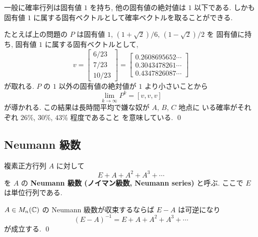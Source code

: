 \documentclass[12pt,twoside]{jarticle}
\begin{document}
\begin{guide}
  一般に確率行列は固有値 $1$ を持ち, 他の固有値の絶対値は $1$ 以下である.
  しかも固有値 $1$ に属する固有ベクトルとして確率ベクトルを取ることができる.

  たとえば上の問題の $P$ は固有値 $1$, $(1+\sqrt{2})/6$, $(1-\sqrt{2})/2$ を
  固有値に持ち, 固有値 $1$ に属する固有ベクトルとして,
  \begin{equation*}
    v = 
    \begin{bmatrix}
      6/23 \\ 7/23 \\ 10/23
    \end{bmatrix}
    =
    \begin{bmatrix}
      0.2608695652\cdots \\ 
      0.3043478261\cdots \\
      0.4347826087\cdots
    \end{bmatrix}
  \end{equation*}
  が取れる.  $P$ の $1$ 以外の固有値の絶対値が $1$ より小さいことから
  \begin{equation*}
    \lim_{k\to\infty} P^k = [v,v,v]
  \end{equation*}
  が導かれる.
  この結果は長時間平均で嫌な奴が $A$, $B$, $C$ 地点に
  いる確率がそれぞれ $26\%$, $30\%$, $43\%$ 程度であること
  を意味している.
  \qed
\end{guide}


\subsection{Neumann 級数}

複素正方行列 $A$ に対して
\begin{equation*}
  E + A + A^2 + A^3 + \cdots
\end{equation*}
を $A$ の {\bf Neumann 級数 (ノイマン級数, Neumann series)} と呼ぶ.
ここで $E$ は単位行列である.

\begin{question}
  $A\in M_n({\mathbb C})$ の Neumann 級数が収束するならば $E-A$ は可逆になり
  \begin{equation*}
    (E - A)^{-1} = E + A + A^2 + A^3 + \cdots
  \end{equation*}
  が成立する. \qed
\end{question}
\end{document}
